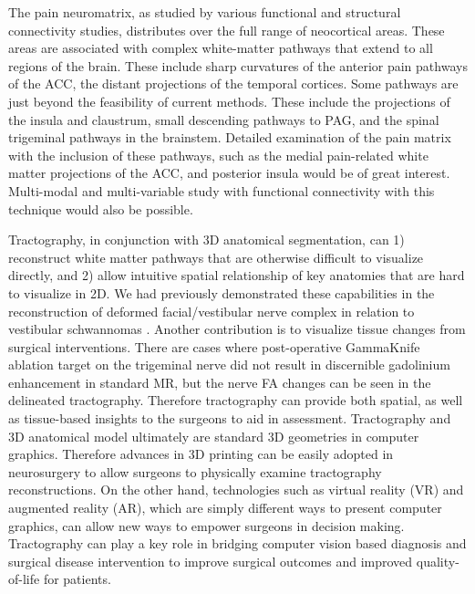 The pain neuromatrix, as studied by various functional and structural connectivity studies, distributes over the full range of neocortical areas. These areas are associated with complex white-matter pathways that extend to all regions of the brain. These include sharp curvatures of the anterior pain pathways of the ACC, the distant projections of the temporal cortices. Some pathways are just beyond the feasibility of current methods. These include the projections of the insula and claustrum, small descending pathways to PAG, and the spinal trigeminal pathways in the brainstem. Detailed examination of the pain matrix with the inclusion of these pathways, such as the medial pain-related white matter projections of the ACC, and posterior insula would be of great interest. Multi-modal and multi-variable study with functional connectivity with this technique would also be possible. 

Tractography, in conjunction with 3D anatomical segmentation, can 1) reconstruct white matter pathways that are otherwise difficult to visualize directly, and 2) allow intuitive spatial relationship of key anatomies that are hard to visualize in 2D. We had previously demonstrated these capabilities in the reconstruction of deformed facial/vestibular nerve complex in relation to vestibular schwannomas \cite{Chen2011b,Behan2017}.
Another contribution is to visualize tissue changes from surgical interventions. There are cases where post-operative GammaKnife ablation target on the trigeminal nerve did not result in discernible gadolinium enhancement in standard MR, but the nerve FA changes can be seen in the delineated tractography. Therefore tractography can provide both spatial, as well as tissue-based insights to the surgeons to aid in assessment.
Tractography and 3D anatomical model ultimately are standard 3D geometries in computer graphics. Therefore advances in 3D printing can be easily adopted in neurosurgery to allow surgeons to physically examine tractography reconstructions. On the other hand, technologies such as virtual reality (VR) and augmented reality (AR), which are simply different ways to present computer graphics, can allow new ways to empower surgeons in decision making. Tractography can play a key role in bridging computer vision based diagnosis and surgical disease intervention to improve surgical outcomes and improved quality-of-life for patients.   

